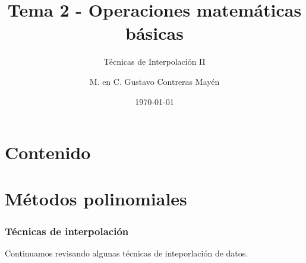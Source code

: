 



\title{\large{Tema 2 - Operaciones matemáticas básicas}}
\subtitle{Técnicas de Interpolación II}
\author{M. en C. Gustavo Contreras Mayén}
\date{\today}

\maketitle
\fontsize{14}{14}\selectfont
{}
\section*{Contenido}
\section{Métodos polinomiales}
\begin{frame}
\frametitle{Técnicas de interpolación}
Continuamos revisando algunas técnicas de inteporlación de datos.
\end{frame}

